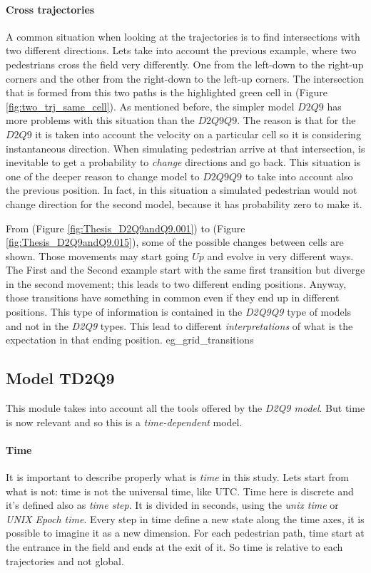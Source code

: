 \documentclass[class=article, crop=false]{standalone}
\begin{document}
\paragraph{Cross trajectories}
A common situation when looking at the trajectories is to find intersections with two different directions.
Lets take into account the previous example, where two pedestrians cross the field very differently.
One from the left-down to the right-up corners and the other from the right-down to the left-up corners.
The intersection that is formed from this two paths is the highlighted green cell in (Figure \ref{fig:two_trj_same_cell}).
As mentioned before, the simpler model $D2Q9$ has more problems with this situation than the $D2Q9Q9$.
The reason is that for the $D2Q9$ it is taken into account the velocity on a particular cell so it is considering instantaneous direction. 
When simulating pedestrian arrive at that intersection, is inevitable to get a probability to \emph{change} directions and go back.
This situation is one of the deeper reason to change model to $D2Q9Q9$ to take into account also the previous position.
In fact, in this situation a simulated pedestrian would not change direction for the second model, because it has probability zero to make it.


From (Figure \ref{fig:Thesis_D2Q9andQ9.001})  to  (Figure \ref{fig:Thesis_D2Q9andQ9.015}), some of the possible changes between cells are shown. 
Those movements may start going $Up$ and evolve in very different ways. 
The First and the Second example start with the same first transition but diverge in the second movement; this leads to two different ending positions. 
Anyway, those transitions have something in common even if they end up in different positions. 
This type of information is contained in the \emph{D2Q9Q9} type of models and not in the \emph{D2Q9} types. 
This lead to different \emph{interpretations} of what is the expectation in that ending position.
	{eg_grid_transitions}



\FloatBarrier
\newpage
\subsection{Model TD2Q9}
This module takes into account all the tools offered by the \emph{D2Q9 model}.
But time is now relevant and so this is a \emph{time-dependent} model.

\paragraph{Time}
It is important to describe properly what is \emph{time} in this study.
Lets start from what is not: time is not the universal time, like UTC.
Time here is discrete and it's defined also as \emph{time step}.
It is divided in seconds, using the \emph{unix time} or \emph{UNIX Epoch time}.
Every step in time define a new state along the time axes, it is possible to imagine it as a new dimension.
For each pedestrian path, time start at the entrance in the field and ends at the exit of it.
So time is relative to each trajectories and not global.
\end{document}

